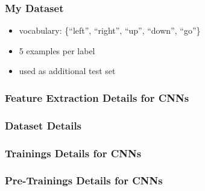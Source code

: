 \begin{frame}
  \frametitle{My Dataset}
  \begin{itemize}
    \item vocabulary: \{\enquote{left}, \enquote{right}, \enquote{up}, \enquote{down}, \enquote{go}\}
    \item 5 examples per label
    \item used as additional test set
  \end{itemize}
  \begin{figure}[!ht]
    \centering
  \end{figure}
\end{frame}

\begin{frame}
  \frametitle{Feature Extraction Details for CNNs}
  
\end{frame}

\begin{frame}
  \frametitle{Dataset Details}
  
\end{frame}

\begin{frame}
  \frametitle{Trainings Details for CNNs}
  
\end{frame}

\begin{frame}
  \frametitle{Pre-Trainings Details for CNNs}
  
\end{frame}

